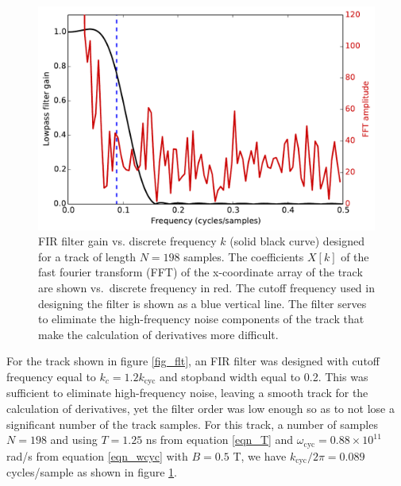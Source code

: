 \documentclass{JINST}
\begin{document}
\begin{figure}[!htb]
	\centering
	\includegraphics[scale=0.6]{fig/FIR_freq_resp_nmagse2_6.pdf}
	\caption{\label{fig_FIR}FIR filter gain vs. discrete frequency $k$ (solid black curve) designed for a track of length $N = 198$ samples.  The coefficients $X[k]$ of the fast fourier transform (FFT) of the x-coordinate array of the track are shown vs.\ discrete frequency in red.  The cutoff frequency used in designing the filter is shown as a blue vertical line.  The filter serves to eliminate the high-frequency noise components of the track that make the calculation of derivatives more difficult.}
\end{figure}

For the track shown in figure \ref{fig_flt}, an FIR filter was designed with 
cutoff frequency equal to $k_c = 1.2k_{\mathrm{cyc}}$ and stopband width equal to 0.2.  This was sufficient to 
eliminate high-frequency noise, leaving a smooth track for the calculation of derivatives, yet the filter order was
low enough so as to not lose a significant number of the track samples.  For this track, a number of samples 
$N = 198$ and using $T = 1.25$ ns from equation \ref{eqn_T} and $\omega_{\mathrm{cyc}} = 0.88 \times 
10^{11}$ rad/s from equation \ref{eqn_wcyc} with $B = 0.5$ T, we have $k_{\mathrm{cyc}}/2\pi = 0.089$ 
cycles/sample as shown in figure \ref{fig_FIR}.
\end{document}
